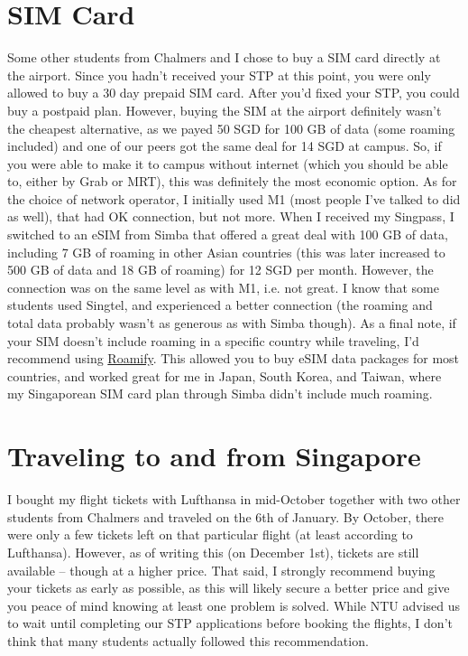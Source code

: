 \section*{SIM Card}
\label{sims}
Some other students from Chalmers and I chose to buy a SIM card directly at the airport. Since you hadn't received your STP at this point, you were only allowed to buy a 30 day prepaid SIM card. After you'd fixed your STP, you could buy a postpaid plan. However, buying the SIM at the airport definitely wasn't the cheapest alternative, as we payed 50 SGD for 100 GB of data (some roaming included) and one of our peers got the same deal for 14 SGD at campus. So, if you were able to make it to campus without internet (which you should be able to, either by Grab or MRT), this was definitely the most economic option. As for the choice of network operator, I initially used M1 (most people I've talked to did as well), that had OK connection, but not more. When I received my Singpass, I switched to an eSIM from Simba that offered a great deal with 100 GB of data, including 7 GB of roaming in other Asian countries (this was later increased to 500 GB of data and 18 GB of roaming) for 12 SGD per month. However, the connection was on the same level as with M1, i.e. not great. I know that some students used Singtel, and experienced a better connection (the roaming and total data probably wasn't as generous as with Simba though). As a final note, if your SIM doesn't include roaming in a specific country while traveling, I'd recommend using \href{https://www.google.com/url?sa=t&source=web&rct=j&opi=89978449&url=https://apps.apple.com/ca/app/roamify-travel-esim-data-call/id6472396976&ved=2ahUKEwi7y9-96omOAxUIJhAIHZvSAG0QFnoECAsQAQ&usg=AOvVaw2EyfUaHaPZfjNMj43MYdyp}{Roamify}. This allowed you to buy eSIM data packages for most countries, and worked great for me in Japan, South Korea, and Taiwan, where my Singaporean SIM card plan through Simba didn't include much roaming.
\section*{Traveling to and from Singapore}
{}
I bought my flight tickets with Lufthansa in mid-October together with two other students from Chalmers and traveled on the 6th of January. By October, there were only a few tickets left on that particular flight (at least according to Lufthansa). However, as of writing this (on December 1st), tickets are still available -- though at a higher price. That said, I strongly recommend buying your tickets as early as possible, as this will likely secure a better price and give you peace of mind knowing at least one problem is solved. While NTU advised us to wait until completing our STP applications before booking the flights, I don't think that many students actually followed this recommendation.

